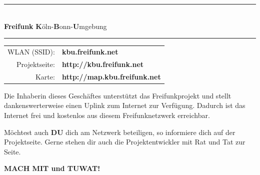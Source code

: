 \documentclass[a4paper,18pt]{scrartcl}
\begin{document}
\begin{center}
\textcolor{ff-gelb}{
\rule{\textwidth}{0.7cm} 
}\\[-0.5cm]
%
\huge \textbf{Freifunk}
\hspace{2cm}
\hspace{2cm}
\textbf{K}öln-\textbf{B}onn-\textbf{U}mgebung

\textcolor{ff-magenta}{
\rule{\textwidth}{0.7cm} 
}
\end{center}

\vspace{-1cm}

\begin{minipage}{0.55\textwidth}
\begin{tabular}{rl}
WLAN (SSID):& \textbf{kbu.freifunk.net}\\
Projektseite:& \textbf{http://kbu.freifunk.net}\\
Karte:& \textbf{http://map.kbu.freifunk.net}
\end{tabular}

\bigskip

Die Inhaberin dieses Geschäftes unterstützt das Freifunkprojekt und stellt dankenswerterweise einen Uplink zum Internet zur Verfügung.
Dadurch ist das Internet frei und kostenlos aus diesem
Freifunknetzwerk erreichbar.

\medskip

Möchtest auch \textbf{DU} dich am Netzwerk beteiligen, so informiere
dich auf der Projektseite. Gerne stehen dir auch die Projektentwickler
mit Rat und Tat zur Seite. 

\bigskip


\bigskip

\textbf{MACH MIT und \glqq{}TUWAT\grqq{}!}

\end{minipage}
%
\hfill{}
%
\end{document}

